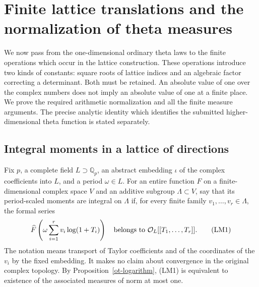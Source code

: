 \section{Finite lattice translations and the normalization of theta measures}
\label{lm-section}

We now pass from the one-dimensional ordinary theta laws to the
finite operations which occur in the lattice construction.  These
operations introduce two kinds of constants: square roots of
lattice indices and an algebraic factor correcting a determinant.
Both must be retained.  An absolute value of one over the complex
numbers does not imply an absolute value of one at a finite place.
We prove the required arithmetic normalization and all the finite
measure arguments.  The precise analytic identity which identifies
the submitted higher-dimensional theta function is stated separately.

\subsection{Integral moments in a lattice of directions}

Fix $p$, a complete field $L\supset\mathbb Q_p$, an abstract
embedding $\iota$ of the complex coefficients into $L$, and a
period $\omega\in L$.  For an entire function $F$ on a
finite-dimensional complex space $V$ and an additive subgroup
$\Lambda\subset V$, say that its period-scaled moments are
integral on $\Lambda$ if, for every finite family
$v_1,\ldots,v_r\in\Lambda$, the formal series
\[
 \widehat F\left(\omega\sum_{i=1}^r v_i\log(1+T_i)\right)
                 \quad\hbox{belongs to }\mathcal O_L[[T_1,\ldots,T_r]].
 \tag{LM1}
\]
The notation means transport of Taylor coefficients and of the
coordinates of the $v_i$ by the fixed embedding.  It makes no
claim about convergence in the original complex topology.
By Proposition~\ref{ot-logarithm}, (LM1) is equivalent to
existence of the associated measures of norm at most one.

